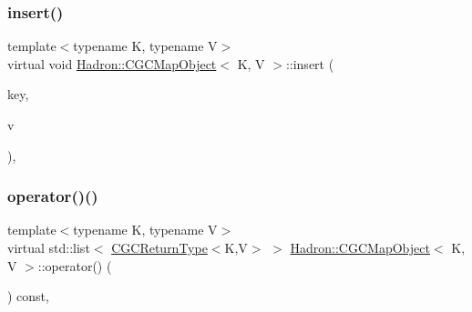\mbox{\label{classHadron_1_1CGCMapObject_a334a88a21755a64719b1081190d2bde2}} 
\subsubsection{\texorpdfstring{insert()}{insert()}\hspace{0.1cm}{\footnotesize\ttfamily [3/3]}}
{\footnotesize\ttfamily template$<$typename K, typename V$>$ \\
virtual void \mbox{\hyperlink{classHadron_1_1CGCMapObject}{Hadron\+::\+C\+G\+C\+Map\+Object}}$<$ K, V $>$\+::insert (\begin{DoxyParamCaption}\item[{const \mbox{\hyperlink{structHadron_1_1CGCKeyType}{C\+G\+C\+Key\+Type}}$<$ K $>$ \&}]{key,  }\item[{const V \&}]{v }\end{DoxyParamCaption})\hspace{0.3cm}{\ttfamily [inline]}, {\ttfamily [virtual]}}

\mbox{\label{classHadron_1_1CGCMapObject_aaa4b18e1a2845e16154cd434462c0779}} 
\subsubsection{\texorpdfstring{operator()()}{operator()()}\hspace{0.1cm}{\footnotesize\ttfamily [1/6]}}
{\footnotesize\ttfamily template$<$typename K, typename V$>$ \\
virtual std\+::list$<$ \mbox{\hyperlink{structHadron_1_1CGCReturnType}{C\+G\+C\+Return\+Type}}$<$K,V$>$ $>$ \mbox{\hyperlink{classHadron_1_1CGCMapObject}{Hadron\+::\+C\+G\+C\+Map\+Object}}$<$ K, V $>$\+::operator() (\begin{DoxyParamCaption}\item[{void}]{ }\end{DoxyParamCaption}) const\hspace{0.3cm}{\ttfamily [inline]}, {\ttfamily [virtual]}}



